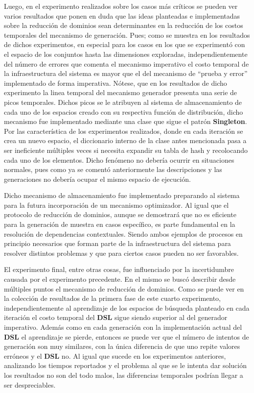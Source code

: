 Luego, en el experimento realizados sobre los casos más críticos se pueden ver varios resultados que ponen en duda
que las ideas planteadas e implementadas sobre la reducción de dominios sean determinantes en la reducción de los
costos temporales del mecanismo de generación. Pues; como se muestra en los resultados de dichos experimentos,
en especial para los casos en los que se experimentó con el espacio de los conjuntos hasta las dimensiones exploradas,
independientemente del número de errores que comenta el mecanismo imperativo el costo temporal de la infraestructura del
sistema es mayor que el del mecanismo de “prueba y error” implementado de forma imperativa. Nótese, que en los resultados
de dicho experimento la linea temporal del mecanismo generador presenta una serie de picos temporales. Dichos picos se le
atribuyen al sistema de almacenamiento de cada uno de los espacios creado con su respectiva función de distribución,
dicho mecanismo fue implementado mediante una clase que sigue el patrón {\bf Singleton}. Por las característica de los experimentos
realizados, donde en cada iteración se crea un nuevo espacio, el diccionario interno de la clase antes mencionada pasa a ser
ineficiente múltiples veces si necesita expandir su tabla de hash y recolocando cada uno de los elementos. Dicho fenómeno no
debería ocurrir en situaciones normales, pues como ya se comentó anteriormente las descripciones y las generaciones no debería
ocupar el mismo espacio de ejecución.

Dicho mecanismo de almacenamiento fue implementado preparando al sistema para la futura incorporación de un mecanismo
optimizador. Al igual que el protocolo de reducción de dominios, aunque se demostrará que no es eficiente para la
generación de muestra en casos específico, es parte fundamental en la resolución de dependencias contextuales. Siendo ambos ejemplos
de procesos en principio necesarios que forman parte de la infraestructura del sistema para resolver distintos problemas
y que para ciertos casos pueden no ser favorables.

El experimento final, entre otras cosas, fue influenciado por la incertidumbre causada por el experimento precedente.
En el mismo se buscó describir desde múltiples puntos el mecanismo de reducción de dominios. Como se puede ver en la
colección de resultados de la primera fase de este cuarto experimento, independientemente
al aprendizaje de los espacios de búsqueda planteado en cada iteración el costo temporal del {\bf DSL} sigue siendo superior
al del generador imperativo. Además como en cada generación con la implementación actual del {\bf DSL} el aprendizaje se pierde,
entonces se puede ver que el número de intentos de generación son muy similares, con la única diferencia de que uno repite
valores erróneos y el {\bf DSL} no. Al igual que sucede en los experimentos anteriores, analizando los tiempos reportados y el problema
al que se le intenta dar solución los resultados no son del todo malos, las diferencias temporales podrían llegar a ser
despreciables.

